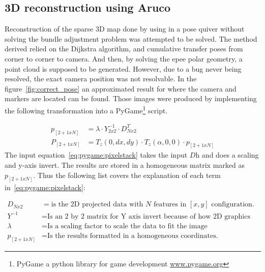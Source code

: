 \subsection{3D reconstruction using Aruco}%
Reconstruction of the sparse 3D map done by using  in a pose quiver without solving the bundle adjustment problem was attempted to be solved.
The method derived relied on the Dijkstra algorithm, and cumulative transfer poses from corner to corner to camera.
And then, by solving the epee polar geometry, a point cloud is supposed to be generated.
However, due to a bug never being resolved, the exact camera position was not resolvable.
In the figure~\ref{fig:correct_pose} an approximated result for where the camera and \aruco{ } markers are located can be found.
Those images were produced by implementing the following transformation into a PyGame\footnote{PyGame a python library for game development \url{www.pygame.org}} script.


\begin{align}
    p_{[2+1xN]} & = \lambda \cdot Y^{-1}_{2x2}\cdot D^{T}_{Nx2} \label{eq:pygame:pixelstack}\\
    P_{[2+1xN]} & = T_{z}(0,dx,dy) \cdot T_{z}(\alpha,0,0) \cdot p_{[2+1xN]} \label{eq:pygame:tf}
\end{align}
The input equation~\ref{eq:pygame:pixelstack} takes the input $D$h and does a scaling and y-axis invert.
The results are stored in a homogeneous matrix marked as $p_{[2+1xN]}$.
Thus the following list covers the explanation of each term in~\ref{eq:pygame:pixelstack}:


\begin{align*}
    D_{Nx2}   &=       \text{is the 2D projected data with $N$ features in $[x,y]$ configuration.}\\
    Y^{-1}    &=       \text{Is an 2 by 2 matrix for Y axis invert because of how 2D graphics works.}\\
    \lambda   &=      \text{Is a scaling factor to scale the data to fit the image}\\
    p_{[2+1xN]} &=      \text{Is the results formatted in a homogeneous coordinates.}
\end{align*}

